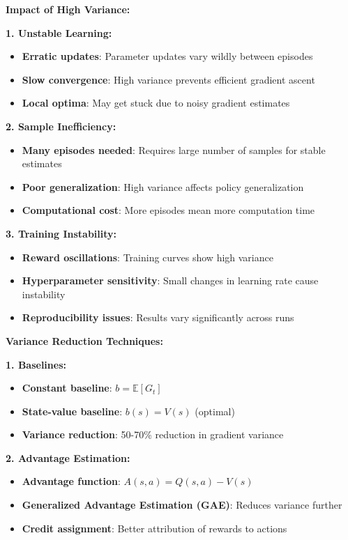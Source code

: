 \documentclass[12pt]{article}
\begin{document}
{{{\textbf{Impact of High Variance:}

\textbf{1. Unstable Learning:}
\begin{itemize}
    \item \textbf{Erratic updates}: Parameter updates vary wildly between episodes
    \item \textbf{Slow convergence}: High variance prevents efficient gradient ascent
    \item \textbf{Local optima}: May get stuck due to noisy gradient estimates
\end{itemize}

\textbf{2. Sample Inefficiency:}
\begin{itemize}
    \item \textbf{Many episodes needed}: Requires large number of samples for stable estimates
    \item \textbf{Poor generalization}: High variance affects policy generalization
    \item \textbf{Computational cost}: More episodes mean more computation time
\end{itemize}

\textbf{3. Training Instability:}
\begin{itemize}
    \item \textbf{Reward oscillations}: Training curves show high variance
    \item \textbf{Hyperparameter sensitivity}: Small changes in learning rate cause instability
    \item \textbf{Reproducibility issues}: Results vary significantly across runs
\end{itemize}

\textbf{Variance Reduction Techniques:}

\textbf{1. Baselines:}
\begin{itemize}
    \item \textbf{Constant baseline}: $b = \mathbb{E}[G_t]$
    \item \textbf{State-value baseline}: $b(s) = V(s)$ (optimal)
    \item \textbf{Variance reduction}: 50-70\% reduction in gradient variance
\end{itemize}

\textbf{2. Advantage Estimation:}
\begin{itemize}
    \item \textbf{Advantage function}: $A(s,a) = Q(s,a) - V(s)$
    \item \textbf{Generalized Advantage Estimation (GAE)}: Reduces variance further
    \item \textbf{Credit assignment}: Better attribution of rewards to actions
\end{itemize}

}}}
\end{document}
